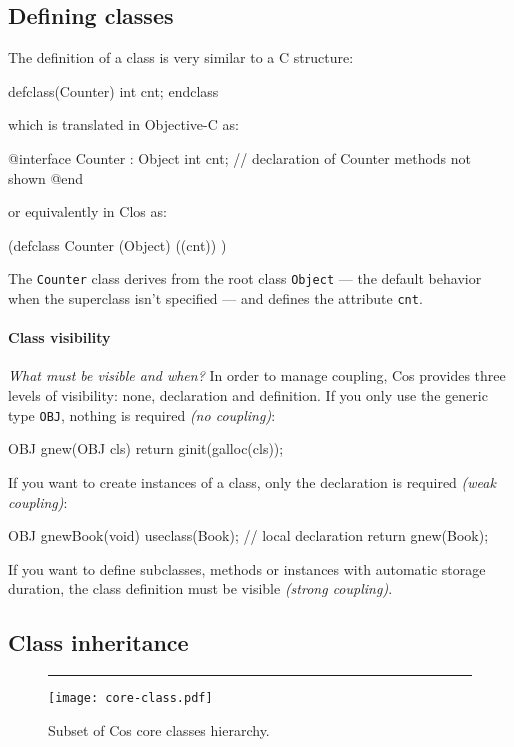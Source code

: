 \documentclass[preprint,10pt]{sigplanconf}
\newcommand{\ProgLang}[1]{{\sc #1}\xspace}
\newcommand{\Clos}      {\ProgLang{Clos}}
\newcommand{\Cos}       {\ProgLang{Cos}}
\newcommand{\Objc}      {\ProgLang{Objective-C}}
\newcommand{\hr}{\rule{\columnwidth}{0.33pt}}
\newcommand{\code}[1]{\lstinline[language=COS,style=samplecode]|#1|}
\begin{document}
\subsection{Defining classes}

The definition of a class is very similar to a C structure:
\begin{COS}
defclass(Counter)
  int cnt;
endclass
\end{COS}
which is translated in \Objc as:
\begin{OBJC}
@interface Counter : Object {
  int cnt;
}
// declaration of Counter methods not shown
@end
\end{OBJC}
or equivalently in \Clos as:
\begin{CLOS}
(defclass Counter (Object) ((cnt)) )
\end{CLOS}
The \code{Counter} class derives from the root class \code{Object} --- the default behavior when the superclass isn't specified --- and defines the attribute \code{cnt}.

\paragraph{Class visibility\label{par:new}}

{\em What must be visible and when?} In order to manage coupling, \Cos provides three levels of visibility: none, declaration and definition. If you only use the generic type \code{OBJ}, nothing is required {\em (no coupling)}:
\begin{COS}
OBJ gnew(OBJ cls) {
  return ginit(galloc(cls));
}
\end{COS}
If you want to create instances of a class, only the declaration is required {\em (weak coupling)}:
\begin{COS}
OBJ gnewBook(void) {
  useclass(Book); // local declaration
  return gnew(Book);
}
\end{COS}
If you want to define subclasses, methods or instances with automatic storage duration, the class definition must be visible {\em (strong coupling)}.

\subsection{Class inheritance}

\begin{figure}\hr
\begin{center}
\texttt{[image: core-class.pdf]}
\end{center}
\vspace{-1mm}
\caption{Subset of \Cos core classes hierarchy.\label{fig:clstree}}
\end{figure}
\end{document}
